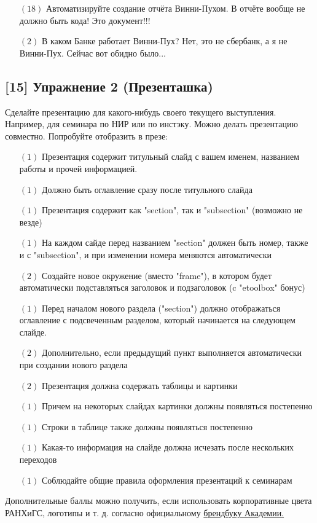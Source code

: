 \documentclass[12pt, a4paper, oneside]{article}
\begin{document}
\begin{itemize}
	\item[$(18)$] Автоматизируйте создание отчёта Винни-Пухом. В отчёте вообще не должно быть кода! Это документ!!!
	\item[$(2)$]  В каком Банке работает Винни-Пух? Нет, это не сбербанк, а я не Винни-Пух. Сейчас вот обидно было...
\end{itemize}


\subsection*{[15]   Упражнение 2 (Презенташка) }

Сделайте презентацию для какого-нибудь своего текущего выступления. Например, для семинара по НИР или по инстэку. Можно делать презентацию совместно. Попробуйте отобразить в презе: 

\begin{itemize}
	\item[$(1)$]   Презентация содержит титульный слайд с вашем именем, названием работы и прочей информацией.
	\item[$(1)$]   Должно быть оглавление сразу после титульного слайда
	\item[$(1)$]   Презентация содержит как "section", так и "subsection" (возможно не везде)
	\item[$(1)$]  На каждом сайде перед названием "section" должен быть номер, также и с "subsection", и при изменении номера меняются автоматически
	\item[$(2)$]  Создайте новое окружение (вместо "frame"), в котором будет автоматически подставляться заголовок и подзаголовок (c "etoolbox" бонус)
	\item[$(1)$]  Перед началом нового раздела ("section") должно отображаться оглавление с подсвеченным разделом, который начинается на следующем слайде.
	\item[$(2)$]  Дополнительно, если предыдущий пункт выполняется автоматически при создании нового раздела
	\item[$(2)$]  Презентация должна содержать таблицы и картинки
	\item[$(1)$]  Причем на некоторых слайдах картинки должны появляться постепенно
	\item[$(1)$]  Строки в таблице также должны появляться постепенно
	\item[$(1)$]  Какая-то информация на слайде должна исчезать после нескольких переходов
	\item[$(1)$]  Соблюдайте общие правила оформления презентаций к семинарам
\end{itemize}

Дополнительные баллы можно получить, если использовать корпоративные цвета РАНХиГС, логотипы и т. д. согласно официальному \href{https://www.ranepa.ru/zhurnalist/firmennyj-stil}{брендбуку Академии.}
\end{document}
